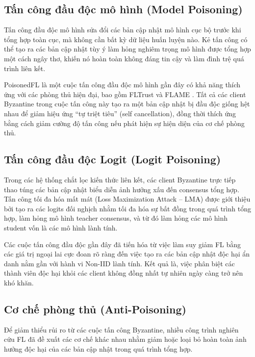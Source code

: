 \subsection{Tấn công đầu độc mô hình (Model Poisoning)}
Tấn công đầu độc mô hình sửa đổi các bản cập nhật mô hình cục bộ trước khi tổng hợp toàn cục, mà không cần bất kỳ dữ liệu huấn luyện nào. Kẻ tấn công có thể tạo ra các bản cập nhật tùy ý làm hỏng nghiêm trọng mô hình được tổng hợp một cách ngây thơ, khiến nó hoàn toàn không đáng tin cậy và làm đình trệ quá trình liên kết.

PoisonedFL \cite{xie2025poisonedfl} là một cuộc tấn công đầu độc mô hình gần đây có khả năng thích ứng với các phòng thủ hiện đại, bao gồm FLTrust \cite{cao2020fltrust} và FLAME \cite{nguyen2022flame}. Tất cả các client Byzantine trong cuộc tấn công này tạo ra một bản cập nhật bị đầu độc giống hệt nhau để giảm hiệu ứng ``tự triệt tiêu'' (self cancellation), đồng thời thích ứng bằng cách giảm cường độ tấn công nếu phát hiện sự hiện diện của cơ chế phòng thủ.

\subsection{Tấn công đầu độc Logit (Logit Poisoning)}
Trong các hệ thống chắt lọc kiến thức liên kết, các client Byzantine trực tiếp thao túng các bản cập nhật biểu diễn ảnh hưởng xấu đến consensus tổng hợp. Tấn công tối đa hóa mất mát (Loss Maximization Attack -- LMA) được giới thiệu bởi \cite{roux2025byzantine} tạo ra các logits đối nghịch nhằm tối đa hóa sự bất đồng trong quá trình tổng hợp, làm hỏng mô hình teacher consensus, và từ đó làm hỏng các mô hình student vốn là các mô hình lành tính.

Các cuộc tấn công đầu độc gần đây đã tiến hóa từ việc làm suy giảm FL bằng các giá trị ngoại lai cực đoan rõ ràng đến việc tạo ra các bản cập nhật độc hại ẩn danh nằm gần với hành vi Non-IID lành tính. Kết quả là, việc phân biệt các thành viên độc hại khỏi các client không đồng nhất tự nhiên ngày càng trở nên khó khăn.

\subsection{Cơ chế phòng thủ (Anti-Poisoning)}
\label{sec:defense}

Để giảm thiểu rủi ro từ các cuộc tấn công Byzantine, nhiều công trình nghiên cứu FL đã đề xuất các cơ chế khác nhau nhằm giảm hoặc loại bỏ hoàn toàn ảnh hưởng độc hại của các bản cập nhật trong quá trình tổng hợp.

